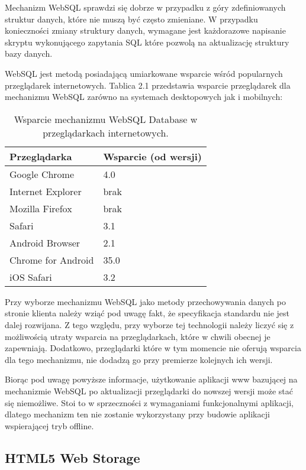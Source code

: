 Mechanizm WebSQL sprawdzi się dobrze w przypadku z góry zdefiniowanych struktur danych, które nie muszą być często zmieniane. W przypadku konieczności zmiany struktury danych, wymagane jest każdorazowe napisanie skryptu wykonującego zapytania SQL które pozwolą na aktualizację struktury bazy danych.

WebSQL jest metodą posiadającą umiarkowane wsparcie wśród popularnych przeglądarek internetowych. Tablica 2.1 przedstawia wsparcie przeglądarek dla mechanizmu WebSQL zarówno na systemach desktopowych jak i mobilnych:

\begin{table}[h]
\centering
    \begin{tabular}{ | p{8cm} | p{6cm} | }
    \hline
    \textbf{Przeglądarka} & \textbf{Wsparcie (od wersji)} \\ \hline
	Google Chrome & 4.0
	\\ \hline
	Internet Explorer & brak
	\\ \hline
	Mozilla Firefox & brak
	\\ \hline
	Safari & 3.1
	\\ \hline
	Android Browser & 2.1
	\\ \hline
	Chrome for Android & 35.0
	\\ \hline
	iOS Safari & 3.2
	\\ \hline
    \end{tabular}
	\caption{Wsparcie mechanizmu WebSQL Database w przeglądarkach internetowych.}
\end{table}

Przy wyborze mechanizmu WebSQL jako metody przechowywania danych po stronie klienta należy wziąć pod uwagę fakt, że specyfikacja standardu nie jest dalej rozwijana. Z tego względu, przy wyborze tej technologii należy liczyć się z możliwością utraty wsparcia na przeglądarkach, które w chwili obecnej je zapewniają. Dodatkowo, przeglądarki które w tym momencie nie oferują wsparcia dla tego mechanizmu, nie dodadzą go przy premierze kolejnych ich wersji.

Biorąc pod uwagę powyższe informacje, użytkowanie aplikacji www bazującej na mechanizmie \mbox{WebSQL} po aktualizacji przeglądarki do nowszej wersji może stać się niemożliwe. Stoi to w sprzeczności z wymaganiami funkcjonalnymi aplikacji, dlatego mechanizm ten nie zostanie wykorzystany przy budowie aplikacji wspierającej tryb offline.

\subsection{HTML5 Web Storage}
\label{sec:html5WebStorage}

